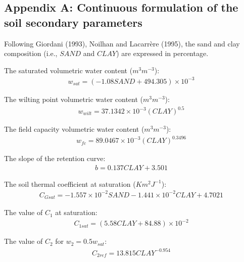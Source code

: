 {%
\subsection{Appendix A: Continuous formulation of the soil secondary
  parameters}
\label{app:contin_foirm_soil_params}

Following Giordani (1993), Noilhan and Lacarr\`{e}re (1995),
the sand and clay composition (i.e., $SAND$ and $CLAY$) are
expressed in percentage.

\bigskip

The saturated volumetric water content ($m^3 m^{-3}$):
\begin{eqnarray}
w_{sat} =  ( -1.08 SAND + 494.305 ) \times 10^{-3}
\end{eqnarray}

The wilting point volumetric water content ($m^3 m^{-3}$):
\begin{eqnarray}
w_{wilt} = 37.1342 \times 10^{-3} (CLAY)^{0.5}
\end{eqnarray}

The field capacity volumetric water content ($m^3 m^{-3}$):
\begin{eqnarray}
w_{fc} = 89.0467 \times 10^{-3} (CLAY)^{0.3496}
\end{eqnarray}

The slope of the retention curve:
\begin{eqnarray}
b = 0.137 CLAY + 3.501
\end{eqnarray}

The soil thermal coefficient at saturation ($K m^2 J^{-1}$):
\begin{eqnarray}
C_{Gsat} = -1.557 \times 10^{-2} SAND -1.441 \times 10^{-2} CLAY
+ 4.7021
\end{eqnarray}

The value of $C_1$ at saturation:
\begin{eqnarray}
C_{1sat} = (5.58 CLAY + 84.88) \times 10^{-2}
\end{eqnarray}

The value of $C_2$ for $w_2=0.5 w_{sat}$:
\begin{eqnarray}
C_{2ref} = 13.815 CLAY^{-0.954}
\end{eqnarray}

}
